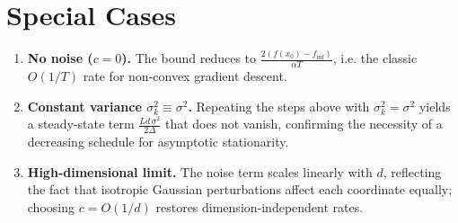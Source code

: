 \documentclass{article}
\begin{document}
\section*{Special Cases}
\begin{enumerate}[label=\alph*)]
\item \textbf{No noise ($c=0$).} The bound reduces to $\frac{2(f(x_{0})-f_{\inf})}{\alpha T}$, i.e. the classic $O(1/T)$ rate for non‑convex gradient descent.
\item \textbf{Constant variance $\sigma_{k}^{2}\equiv\sigma^{2}$.} Repeating the steps above with $\sigma_{k}^{2}=\sigma^{2}$ yields a steady‑state term $\frac{L d\,\sigma^{2}}{2\Delta}$ that does not vanish, confirming the necessity of a decreasing schedule for asymptotic stationarity.
\item \textbf{High‑dimensional limit.} The noise term scales linearly with $d$, reflecting the fact that isotropic Gaussian perturbations affect each coordinate equally; choosing $c=O(1/d)$ restores dimension‑independent rates.
\end{enumerate}
\end{document}
